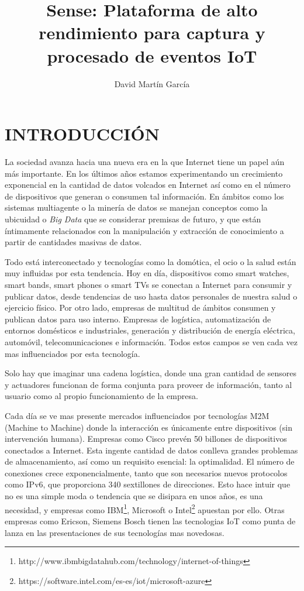 \documentclass{pre-tfg}
\title{Sense: Plataforma de alto rendimiento para captura y procesado de eventos IoT}
\author{David Martín García}
\begin{document}
\maketitle
\tableofcontents

\newpage

\section{INTRODUCCIÓN}

La sociedad avanza hacia una nueva era en la que Internet tiene un papel aún más
importante. En los últimos años estamos experimentando un crecimiento exponencial en la
cantidad de datos volcados en Internet así como en el número de dispositivos que generan o
consumen tal información. En ámbitos como los sistemas multiagente o la minería de datos
se manejan conceptos como la ubicuidad o \emph{Big Data} que se considerar premisas de
futuro, y que están íntimamente relacionados con la manipulación y extracción de
conocimiento a partir de cantidades masivas de datos.

Todo está interconectado y tecnologías como la domótica, el ocio o la salud están muy
influidas por esta tendencia. Hoy en día, dispositivos como smart watches, smart bands,
smart phones o smart TVs se conectan a Internet para consumir y publicar datos, desde
tendencias de uso hasta datos personales de nuestra salud o ejercicio físico. Por otro
lado, empresas de multitud de ámbitos consumen y publican datos para uso interno. Empresas
de logística, automatización de entornos domésticos e industriales, generación y
distribución de energía eléctrica, automóvil, telecomunicaciones e información. Todos
estos campos se ven cada vez mas influenciados por esta tecnología.

Solo hay que imaginar una cadena logística, donde una gran cantidad de sensores y
actuadores funcionan de forma conjunta para proveer de información, tanto al usuario como
al propio funcionamiento de la empresa.

Cada día se ve mas presente mercados influenciados por tecnologías M2M (Machine to
Machine) donde la interacción es únicamente entre dispositivos (sin intervención
humana). Empresas como Cisco prevén 50 billones de dispositivos conectados a
Internet. Esta ingente cantidad de datos conlleva grandes problemas de almacenamiento, así
como un requisito esencial: la optimalidad. El número de conexiones crece
exponencialmente, tanto que son necesarios nuevos protocolos como IPv6, que proporciona 340
sextillones de direcciones. Esto hace intuir que no es una simple moda o tendencia que se
disipara en unos años, es una necesidad, y empresas como
IBM\footnote{http://www.ibmbigdatahub.com/technology/internet-of-things}, Microsoft o
Intel\footnote{https://software.intel.com/es-es/iot/microsoft-azure} apuestan por
ello. Otras empresas como Ericson, Siemens Bosch tienen las tecnologias IoT como punta de
lanza en las presentaciones de sus tecnologías mas novedosas.
\end{document}
